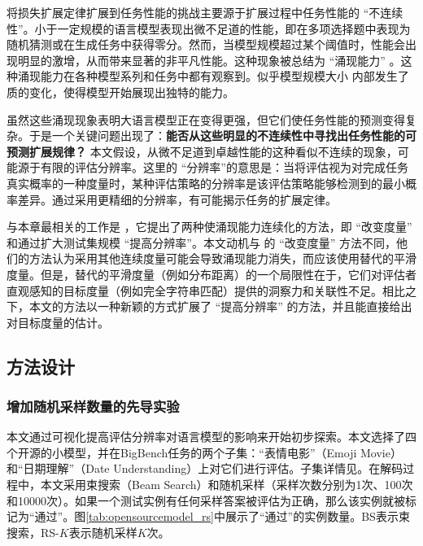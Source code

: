 将损失扩展定律扩展到任务性能的挑战主要源于扩展过程中任务性能的 “不连续性”。小于一定规模的语言模型表现出微不足道的性能，即在多项选择题中表现为随机猜测或在生成任务中获得零分。然而，当模型规模超过某个阈值时，性能会出现明显的激增，从而带来显著的非平凡性能。这种现象被总结为 “涌现能力” \citep{srivastava2022beyond, wei2022emergent}。这种涌现能力在各种模型系列和任务中都有观察到。似乎模型规模大小 内部发生了质的变化，使得模型开始展现出独特的能力。

虽然这些涌现现象表明大语言模型正在变得更强，但它们使任务性能的预测变得复杂。于是一个关键问题出现了：\textbf{能否从这些明显的不连续性中寻找出任务性能的可预测扩展规律？} 本文假设，从微不足道到卓越性能的这种看似不连续的现象，可能源于有限的评估分辨率。这里的 “分辨率”的意思是：当将评估视为对完成任务真实概率的一种度量时，某种评估策略的分辨率是该评估策略能够检测到的最小概率差异。通过采用更精细的分辨率，有可能揭示任务的扩展定律。 

与本章最相关的工作是 \citet{schaeffer2023emergent}，它提出了两种使涌现能力连续化的方法，即 “改变度量” 和通过扩大测试集规模 “提高分辨率”。本文动机与 \citet{schaeffer2023emergent} 的 “改变度量” 方法不同，他们的方法认为采用其他连续度量可能会导致涌现能力消失，而应该使用替代的平滑度量。但是，替代的平滑度量（例如分布距离）的一个局限性在于，它们对评估者直观感知的目标度量（例如完全字符串匹配）提供的洞察力和关联性不足。相比之下，本文的方法以一种新颖的方式扩展了 “提高分辨率” 的方法，并且能直接给出对目标度量的估计。

\subsection{方法设计}
\subsubsection{增加随机采样数量的先导实验}
\label{sec:pilot}
本文通过可视化提高评估分辨率对语言模型的影响来开始初步探索。本文选择了四个开源的小模型，并在BigBench任务的两个子集\citep{srivastava2022beyond}：“表情电影”（Emoji Movie）和“日期理解”（Date Understanding）上对它们进行评估。子集详情见。在解码过程中，本文采用束搜索（Beam Search）和随机采样（采样次数分别为1次、100次和10000次）。如果一个测试实例有任何采样答案被评估为正确，那么该实例就被标记为“通过”。图\ref{tab:opensourcemodel_rs}中展示了“通过”的实例数量。BS表示束搜索，RS-$K$表示随机采样$K$次。

